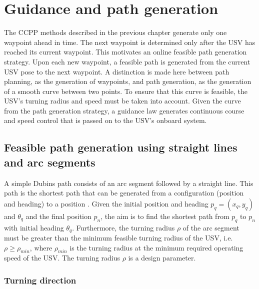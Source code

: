 \chapter{Guidance and path generation}

The CCPP methods described in the previous chapter generate only one waypoint ahead in time. The next waypoint is determined only after the USV has reached its current waypoint. This motivates an online feasible path generation strategy. Upon each new waypoint, a feasible path is generated from the current USV pose to the next waypoint. A distinction is made here between path planning, as the generation of waypoints, and path generation, as the generation of a smooth curve between two points. To ensure that this curve is feasible, the USV's turning radius and speed must be taken into account. Given the curve from the path generation strategy, a guidance law generates continuous course and speed control that is passed on to the USV's onboard system.  

\section{Feasible path generation using straight lines and arc segments} \label{sec:pathgen}

A simple Dubins path consists of an arc segment followed by a straight line. This path is the shortest path that can be generated from a configuration (position and heading) to a position \citep{Scibilia2012}. Given the initial position and heading $p_q = (x_q, y_q)$ and $\theta_q$ and the final position $p_n$, the aim is to find the shortest path from $p_q$ to $p_n$ with initial heading $\theta_q$. Furthermore, the turning radius $\rho$ of the arc segment must be greater than the minimum feasible turning radius of the USV, i.e. $\rho \geq \rho_{min}$, where $\rho_{min}$ is the turning radius at the minimum required operating speed of the USV. The turning radius $\rho$ is a design parameter.


\subsection{Turning direction}

